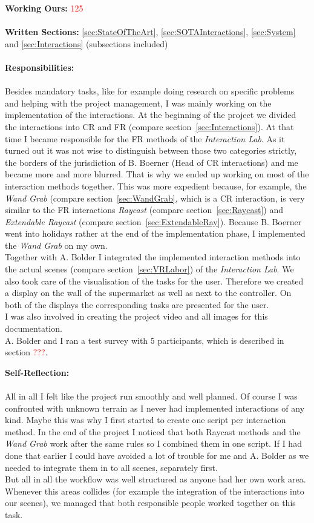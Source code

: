 \textbf{Working Ours:} \textcolor{red}{125} \\ \\
\textbf{Written Sections:} \ref{sec:StateOfTheArt},  \ref{sec:SOTAInteractions}, \ref{sec:System} and \ref{sec:Interactions} (subsections included) \\ \\
\textbf{Responsibilities:}\\ \\
Besides mandatory tasks, like for example doing research on specific problems and helping with the project management, I was mainly working on the implementation of the interactions. At the beginning of the project we divided the interactions into CR and FR (compare section~\ref{sec:Interactions}). At that time I became responsible for the FR methods of the \textit{Interaction Lab}. As it turned out it was not wise to distinguish between those two categories strictly, the borders of the jurisdiction of B. Boerner (Head of CR interactions) and me became more and more blurred. That is why we ended up working on most of the interaction methods together. This was more expedient because, for example, the \textit{Wand Grab} (compare section~\ref{sec:WandGrab}, which is a CR interaction, is very similar to the FR interactions \textit{Raycast} (compare section~\ref{sec:Raycast}) and \textit{Extendable Raycast} (compare section~\ref{sec:ExtendableRay}). Because B. Boerner went into holidays rather at the end of the implementation phase, I implemented the \textit{Wand Grab} on my own. \\
Together with A. Bolder I integrated the implemented interaction methods into the actual scenes (compare section~\ref{sec:VRLabor}) of the \textit{Interaction Lab}. We also took care of the visualisation of the tasks for the user. Therefore we created a display on the wall of the supermarket as well as next to the controller. On both of the displays the corresponding tasks are presented for the user. \\
I was also involved in creating the project video and all images for this documentation.\\
A. Bolder and I ran a test survey with 5 participants, which is described in section \textcolor{red}{???}.

\textbf{Self-Reflection:}\\ \\
All in all I felt like the project run smoothly and well planned. Of course I was confronted with unknown terrain as I never had implemented interactions of any kind. Maybe this was why I first started to create one script per interaction method. In the end of the project I noticed that both Raycast methods and the \textit{Wand Grab} work after the same rules so I combined them in one script. If I had done that earlier I could have avoided a lot of trouble for me and A. Bolder as we needed to integrate them in to all scenes, separately first. \\
But all in all the workflow was well structured as anyone had her own work area. Whenever this areas collides (for example the integration of the interactions into our scenes), we managed that both responsible people worked together on this task.

